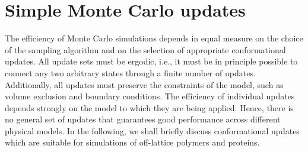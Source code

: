 \documentclass[12pt]{report}
\begin{document}
\section{Simple Monte Carlo updates}
The efficiency of Monte Carlo simulations depends in equal measure on the choice of  the sampling algorithm and on the selection of appropriate conformational updates. All update sets must be ergodic, i.e., it must be in principle possible to connect any two arbitrary states through a finite number of updates. Additionally, all updates must preserve the constraints of the model, such as volume exclusion and boundary conditions. The efficiency of individual updates depends strongly on the model to which they are being applied. Hence, there is no general set of updates that guarantees good performance across different physical models. In the following, we shall briefly discuss conformational updates which are suitable for simulations of off-lattice polymers and proteins. 
\end{document}

